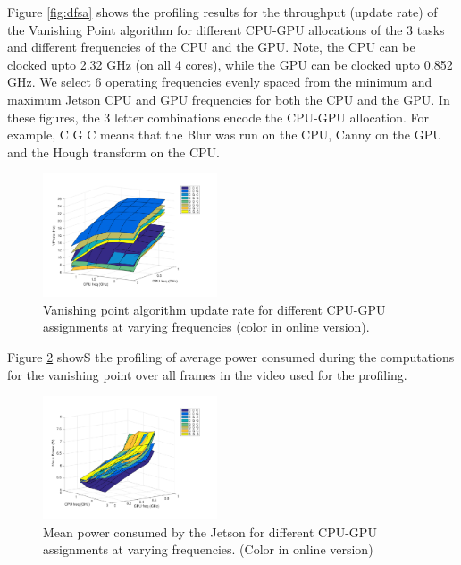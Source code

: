 

Figure \ref{fig:dfsa} shows the profiling results for the throughput (update rate) of the Vanishing Point algorithm for different CPU-GPU allocations of the 3 tasks and different frequencies of the CPU and the GPU. 
Note, the CPU can be clocked upto 2.32 GHz (on all 4 cores), while the GPU can be clocked upto 0.852 GHz. 
We select 6 operating frequencies evenly spaced from the minimum and maximum Jetson CPU and GPU frequencies for both the CPU and the GPU. 
In these figures, the 3 letter combinations encode the CPU-GPU allocation.
For example, C G C means that the Blur was run on the CPU, Canny on the GPU and the Hough transform on the CPU.


\begin{figure}[htbp]
	\centering
	\includegraphics[width=0.46\textwidth]{Figs/surf_Rate.pdf}
	\caption{Vanishing point algorithm update rate for different CPU-GPU assignments at varying frequencies (color in online version).}
	\label{fig:sfda}%
\end{figure}


Figure \ref{fig:sfda_pow} showS the profiling of average power consumed during the computations for the vanishing point over all frames in the video used for the profiling.


\begin{figure}[htbp]
	\centering
	\includegraphics[width=0.46\textwidth]{Figs/surf_Power.pdf}
	\caption{Mean power consumed by the Jetson for different CPU-GPU assignments at varying frequencies. (Color in online version)}
	\label{fig:sfda_pow}%
\end{figure}

